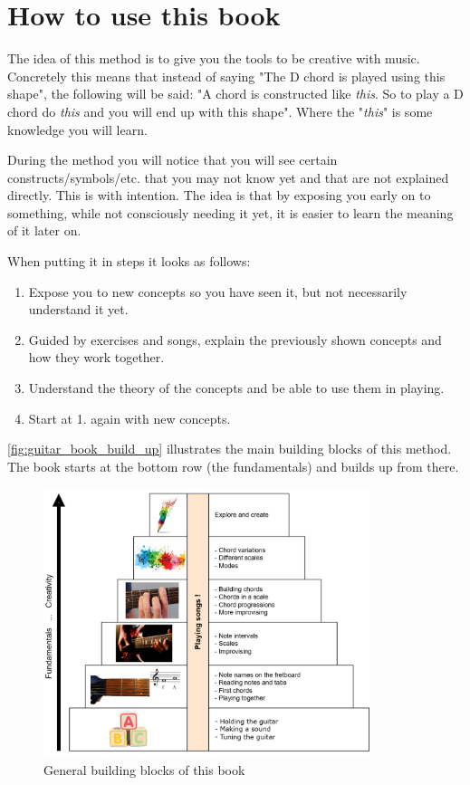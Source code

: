 \chapter{How to use this book}

The idea of this method is to give you the tools to be creative with music. Concretely this means that instead of saying "The D chord is played using this shape", the following will be said: "A chord is constructed like \textit{this}. So to play a D chord do \textit{this} and you will end up with this shape". Where the "\textit{this}" is some knowledge you will learn.

During the method you will notice that you will see certain constructs/symbols/etc. that you may not know yet and that are not explained directly. This is with intention. The idea is that by exposing you early on to something, while not consciously needing it yet, it is easier to learn the meaning of it later on.

When putting it in steps it looks as follows:

\begin{enumerate}
	\item Expose you to new concepts so you have seen it, but not necessarily understand it yet.
	\item Guided by exercises and songs, explain the previously shown concepts and how they work together.
	\item Understand the theory of the concepts and be able to use them in playing.
	\item Start at 1. again with new concepts.
\end{enumerate}

\autoref{fig:guitar_book_build_up} illustrates the main building blocks of this method. The book starts at the bottom row (the fundamentals) and builds up from there.

\begin{figure}[!b]
	\centering
	\includegraphics[width=0.85\textwidth]{../../Images/BookBuildup.png}
	\caption{General building blocks of this book}
	\label{fig:guitar_book_build_up}
\end{figure}

